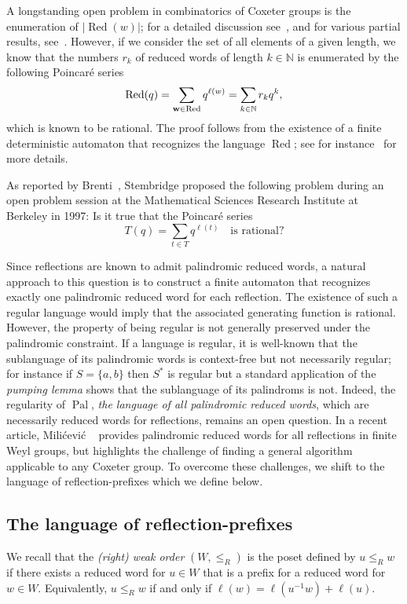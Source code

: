 \documentclass{amsart}
\theoremstyle{definition}
\newcommand{\Red}{{\operatorname{Red}}}
\newcommand{\RPal}{\operatorname{Pal}}
\begin{document}
A longstanding open problem in combinatorics of Coxeter groups is the enumeration of $|\Red(w)|$; for a detailed discussion see~\cite[p.123]{BB}, and for various partial results, see~\cite{Eriksson,Hart}.  However, if we consider the set of all elements of a given length, we know that the numbers $r_k$ of reduced words of length $k\in \mathbb N$ is enumerated by  the following Poincar\'e series
$$
\Red(q)=\sum_{\bold w\in \Red} q^{\ell(w)}=\sum_{k\in\mathbb N} r_kq^k,
$$
which is known to be rational. The proof follows from the existence of a finite deterministic automaton that recognizes the language $\Red$; see for instance~\cite[Theorem~4.9.1]{BB} for more details. 

\smallskip

As reported by Brenti~\cite{B1}, Stembridge proposed the following problem during an open problem session at the Mathematical Sciences Research Institute at Berkeley in 1997: Is it true that the Poincar\'e series
$$
T(q)=\sum_{t\in T} q^{\ell(t)}\quad \textrm{is rational?}
$$ 

\textbf{}Since reflections are known to admit palindromic reduced words, a natural approach to this question is to construct a finite automaton that recognizes exactly one palindromic reduced word for each reflection. The existence of such a regular language would imply that the associated generating function is rational. However, the property of being regular is not generally preserved under the palindromic constraint. If a language is regular, it is well-known that the sublanguage of its palindromic words is context-free but not necessarily regular; for instance if $S=\{a,b\}$ then $S^*$ is regular but a standard application of the {\em pumping lemma} shows that the sublanguage of its palindroms is not.  Indeed, the regularity of $\RPal$, {\em the language of all palindromic reduced words}, which are necessarily reduced words for reflections, remains an open question. In a recent article, Mili\'cevi\'c ~\cite{Mili} provides palindromic reduced words for all reflections in finite Weyl groups, but highlights the challenge of finding a general algorithm applicable to any Coxeter group. To overcome these challenges, we shift to the language of reflection-prefixes which we define below. 


\subsection*{The language of reflection-prefixes}  

We recall that the {\em (right) weak order} $(W,\leq_R)$ is the poset defined by $u\leq_R w$ if there exists a reduced word for $u\in W$ that is a prefix for a reduced word for $w\in W$. Equivalently, $u\leq_R w$ if and only if $\ell(w)=\ell(u^{-1}w)+\ell(u)$.
\end{document}

